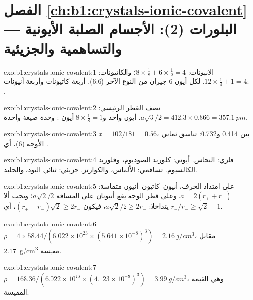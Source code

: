 \section*{الفصل \ref{ch:b1:crystals-ionic-covalent} --- البلورات (2): الأجسام الصلبة الأيونية والتساهمية والجزيئية}

\begin{solution}{exo:b1:crystals-ionic-covalent:1}
الأنيونات: $8 \times \frac18 + 6 \times \frac12 = 4$؛ والكاتيونات: $12 \times
\frac14 + 1 = 4$. لكل أيون 6 جيران من النوع الآخر (6:6). أربعة
كاتيونات وأربعة أنيونات: .
\end{solution}

\begin{solution}{exo:b1:crystals-ionic-covalent:2}
نصف القطر الرئيسي: $a\sqrt3/2 = 412.3 \times 0.866 = \qty{357.1}{pm}$.
أيون  واحد و$8 \times \frac18 = 1$ أيون : وحدة صيغة واحدة.
\end{solution}

\begin{solution}{exo:b1:crystals-ionic-covalent:3}
$x = 102/181 = 0.56$، بين 0.414 و0.732: تناسق ثماني الأوجه
(6)، أي .
\end{solution}

\begin{solution}{exo:b1:crystals-ionic-covalent:4}
فلزي: النحاس. أيوني: كلوريد الصوديوم، وفلوريد الكالسيوم. تساهمي:
الألماس، والكوارتز. جزيئي: ثنائي اليود، والجليد.
\end{solution}

\begin{solution}{exo:b1:crystals-ionic-covalent:5}
على امتداد الحرف، أنيون--كاتيون--أنيون متماسة: $a = 2(r_+ + r_-)$. وعلى
قطر الوجه يقع أنيونان على المسافة $a\sqrt2/2$؛ ويجب ألا
يتداخلا: $a\sqrt2/2 \ge 2r_-$، فيكون $(r_+ + r_-)\sqrt2 \ge 2r_-$، أي
$r_+/r_- \ge \sqrt2 - 1$.
\end{solution}

\begin{solution}{exo:b1:crystals-ionic-covalent:6}
$\rho = 4 \times 58.44/(6.022 \times 10^{23} \times (5.641 \times
10^{-8})^3) = \qty{2.16}{g/cm^3}$، مقابل \qty{2.17}{g/cm^3} مقيسة.
\end{solution}

\begin{solution}{exo:b1:crystals-ionic-covalent:7}
$\rho = 168.36/(6.022 \times 10^{23} \times (4.123 \times 10^{-8})^3) =
\qty{3.99}{g/cm^3}$، وهي القيمة المقيسة.
\end{solution}


